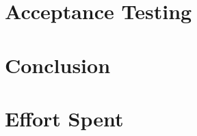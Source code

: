 \clearpage
\section{Acceptance Testing}
\label{sect:acceptance_testing}


\clearpage
\section{Conclusion}
\label{sect:conclusion}


\clearpage
\section{Effort Spent}
\label{sect:effort}



% 
% 

